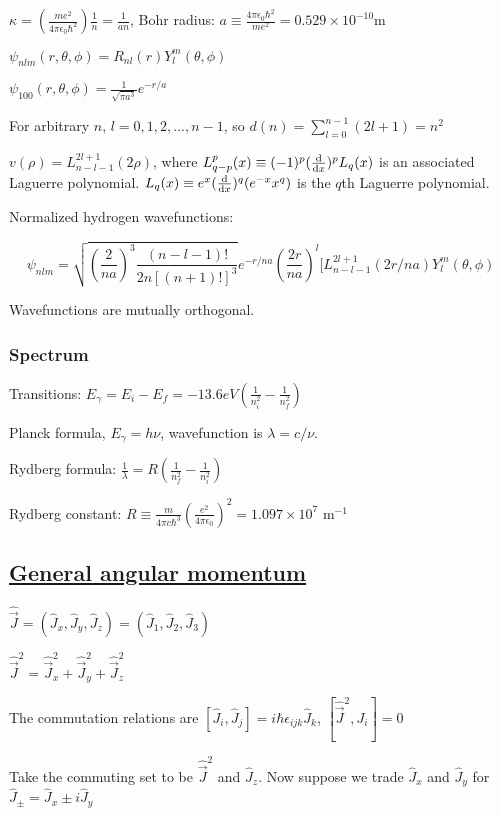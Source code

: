 $\kappa = (\frac{me^2}{4 \pi \epsilon_0 \hbar^2}) \frac{1}{n} = \frac{1}{an}$, Bohr radius: $a \equiv \frac{4 \pi \epsilon_0 \hbar^2}{me^2} = 0.529 \times 10^{-10} \textrm{m}$

$\psi_{nlm}(r, \theta, \phi) = R_{nl}(r) Y_l^m(\theta, \phi)$

$\psi_{100}(r, \theta, \phi) = \frac{1}{\sqrt{\pi a^3}} e^{-r/a}$

For arbitrary $n$, $l = 0, 1, 2, ..., n-1$, so $d(n) = \sum_{l=0}^{n-1} (2l+1) = n^2$

$v(\rho) = L_{n-l-1}^{2l+1} (2 \rho)$, where $L_{q-p}^p(x) \equiv (-1)^p (\dv{}{x})^p L_q (x)$ is an associated Laguerre polynomial. $L_q(x) \equiv e^x (\dv{}{x})^q (e^{-x} x^q)$ is the $q$th Laguerre polynomial.

Normalized hydrogen wavefunctions:

$$\psi_{nlm} = \sqrt{(\frac{2}{na})^3 \frac{(n-l-1)!}{2n[(n+1)!]^3}} e^{-r/na} (\frac{2r}{na})^l [L_{n-l-1}^{2l+1} (2r/na) Y_l^m (\theta, \phi)$$

Wavefunctions are mutually orthogonal.

\subsubsection{Spectrum}

Transitions: $E_{\gamma} = E_i - E_f = -13.6 eV(\frac{1}{n_i^2} - \frac{1}{n_f^2})$

Planck formula, $E_{\gamma} = h \nu$, wavefunction is $\lambda = c / \nu$. 

Rydberg formula: $\frac{1}{\lambda} = R(\frac{1}{n^2_f} - \frac{1}{n^2_i})$

Rydberg constant: $R \equiv \frac{m}{4 \pi c \hbar^3} (\frac{e^2}{4 \pi \epsilon_0})^2 = 1.097 \times 10^7 \textrm{ m}^{-1}$

\subsection{\underline{General angular momentum}}
$\widehat{\vec{J}} = (\widehat{J}_x, \widehat{J}_y, \widehat{J}_z) = (\widehat{J}_1, \widehat{J}_2, \widehat{J}_3)$

$\widehat{\vec{J}}^2 = \widehat{\vec{J}}^2_x + \widehat{\vec{J}}^2_y + \widehat{\vec{J}}^2_z$

The commutation relations are $[\widehat{J}_i, \widehat{J}_j] = i \hbar \epsilon_{ijk} \widehat{J}_k$, $[\widehat{\vec{J}}^2, J_i] = 0$

Take the commuting set to be $\widehat{\vec{J}}^2$ and $\widehat{J}_z$. Now suppose we trade $\widehat{J}_x$ and $\widehat{J}_y$ for $\widehat{J}_{\pm} = \widehat{J}_x \pm i \widehat{J}_y$


